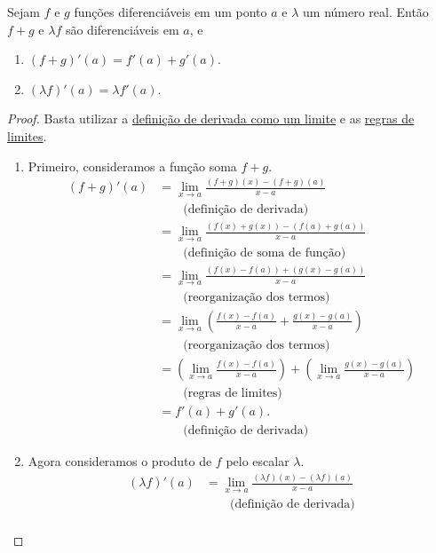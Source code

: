 \begin{theorem}
	Sejam $f$ e $g$ funções diferenciáveis em um ponto $a$ e $\lambda$ um número real. Então $f+g$ e $\lambda f$ são diferenciáveis em $a$, e
	\begin{enumerate}
		\item $(f+g)'(a)=f'(a)+g'(a)$.
		\item $(\lambda f)'(a)=\lambda f'(a)$.
	\end{enumerate}
\end{theorem}

\begin{proof}
	Basta utilizar a \href{../09.derivadas/con_der_em_pt_moodle.html}{definição de derivada como um limite} e as \href{../02.limites_elementares/teo_regras_lim_moodle.html}{regras de limites}.
	
	\begin{enumerate}
		\item Primeiro, consideramos a função soma $f+g$.
			\begin{align*}
				(f+g)'(a)
					&=\lim_{x\to a}\frac{(f+g)(x)-(f+g)(a)}{x-a}\\
					&\qquad\text{(definição de derivada)}\\
					&=\lim_{x\to a}\frac{\left(f(x)+g(x)\right)-\left(f(a)+g(a)\right)}{x-a}\\
					&\qquad\text{(definição de soma de função)}\\
					&=\lim_{x\to a}\frac{\left(f(x)-f(a)\right)+\left(g(x)-g(a)\right)}{x-a}\\
					&\qquad\text{(reorganização dos termos)}\\
					&=\lim_{x\to a}\left(\frac{f(x)-f(a)}{x-a}+\frac{g(x)-g(a)}{x-a}\right)\\
					&\qquad\text{(reorganização dos termos)}\\
					&=\left(\lim_{x\to a}\frac{f(x)-f(a)}{x-a}\right)+\left(\lim_{x\to a}\frac{g(x)-g(a)}{x-a}\right)\\
					&\qquad\text{(regras de limites)}\\
					&=f'(a)+g'(a).\\
					&\qquad\text{(definição de derivada)}
			\end{align*}
		\item Agora consideramos o produto de $f$ pelo escalar $\lambda$.
			\begin{align*}
				(\lambda f)'(a)
					&=\lim_{x\to a}\frac{(\lambda f)(x)-(\lambda f)(a)}{x-a}\\
					&\qquad\text{(definição de derivada)}\\

\end{align*}
\end{enumerate}
\end{proof}
